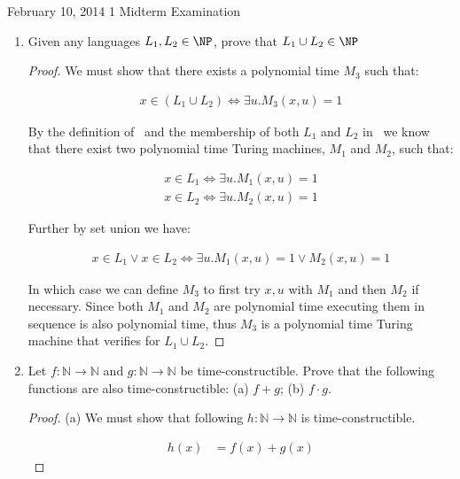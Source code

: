 \documentclass[usletter]{article}
\begin{document}
           {February 10, 2014}
           {1}
           {Midterm Examination}

\begin{enumerate}
  \item Given any languages $L_1, L_2 \in \NP$, prove that $L_1 \cup L_2 \in \NP$
    \begin{proof}
      We must show that there exists a polynomial time $M_3$ such that:

      \begin{align}
        x \in (L_1 \cup L_2) \iff \exists u.M_3(x,u) = 1
      \end{align}

      By the definition of \NP\ and the membership of both $L_1$ and $L_2$ in \NP\  we know that there exist two polynomial time Turing machines, $M_1$ and $M_2$, such that:

      \begin{align}
        x \in L_1 \iff \exists u.M_1(x,u) = 1 \\
        x \in L_2 \iff \exists u.M_2(x,u) = 1
      \end{align}

      Further by set union we have:

      \begin{align}
        x \in L_1 \lor x \in L_2 \iff \exists u.M_1(x,u) = 1 \lor  M_2(x,u) = 1
      \end{align}

      In which case we can define $M_3$ to first try $x,u$ with $M_1$ and then $M_2$ if necessary. Since both $M_1$ and $M_2$ are polynomial time executing them in sequence is also polynomial time, thus $M_3$ is a polynomial time Turing machine that verifies for $L_1 \cup L_2$.
    \end{proof}

    \newpage

  \item Let $f : \mathbb{N} \rightarrow \mathbb{N}$ and $g : \mathbb{N} \rightarrow \mathbb{N}$ be time-constructible. Prove that the following functions are also time-constructible: (a) $f + g$; (b) $f \cdot g$.


    \begin{proof} (a)
      We must show that following $h : \mathbb{N} \rightarrow \mathbb{N}$ is time-constructible.

      \begin{align*}
        h(x) &= f(x) + g(x)
      \end{align*}


\end{proof}
\end{enumerate}
\end{document}
